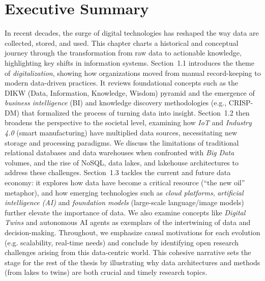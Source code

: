 
\section*{Executive Summary}
In recent decades, the surge of digital technologies has reshaped the way data are collected, stored, and used. This chapter charts a historical and conceptual journey through the transformation from raw data to actionable knowledge, highlighting key shifts in information systems. Section~1.1 introduces the theme of \emph{digitalization}, showing how organizations moved from manual record-keeping to modern data-driven practices. It reviews foundational concepts such as the DIKW (Data, Information, Knowledge, Wisdom) pyramid and the emergence of \emph{business intelligence} (BI) and knowledge discovery methodologies (e.g., CRISP-DM) that formalized the process of turning data into insight. Section~1.2 then broadens the perspective to the societal level, examining how \emph{IoT} and \emph{Industry 4.0} (smart manufacturing) have multiplied data sources, necessitating new storage and processing paradigms. We discuss the limitations of traditional relational databases and data warehouses when confronted with \emph{Big Data} volumes, and the rise of NoSQL, data lakes, and lakehouse architectures to address these challenges. Section~1.3 tackles the current and future data economy: it explores how data have become a critical resource (“the new oil” metaphor), and how emerging technologies such as \emph{cloud platforms}, \emph{artificial intelligence (AI)} and \emph{foundation models} (large-scale language/image models) further elevate the importance of data. We also examine concepts like \emph{Digital Twins} and autonomous AI agents as exemplars of the intertwining of data and decision-making. Throughout, we emphasize causal motivations for each evolution (e.g. scalability, real-time needs) and conclude by identifying open research challenges arising from this data-centric world. This cohesive narrative sets the stage for the rest of the thesis by illustrating why data architectures and methods (from lakes to twins) are both crucial and timely research topics.

\clearpage

